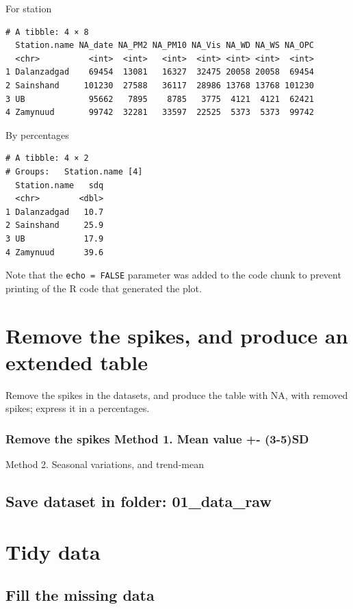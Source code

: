 \documentclass[
]{agujournal2019}
\begin{document}
For station

\begin{verbatim}
# A tibble: 4 × 8
  Station.name NA_date NA_PM2 NA_PM10 NA_Vis NA_WD NA_WS NA_OPC
  <chr>          <int>  <int>   <int>  <int> <int> <int>  <int>
1 Dalanzadgad    69454  13081   16327  32475 20058 20058  69454
2 Sainshand     101230  27588   36117  28986 13768 13768 101230
3 UB             95662   7895    8785   3775  4121  4121  62421
4 Zamynuud       99742  32281   33597  22525  5373  5373  99742
\end{verbatim}

By percentages

\begin{verbatim}
# A tibble: 4 × 2
# Groups:   Station.name [4]
  Station.name   sdq
  <chr>        <dbl>
1 Dalanzadgad   10.7
2 Sainshand     25.9
3 UB            17.9
4 Zamynuud      39.6
\end{verbatim}

Note that the \texttt{echo\ =\ FALSE} parameter was added to the code
chunk to prevent printing of the R code that generated the plot.

\section{Remove the spikes, and produce an extended
table}\label{remove-the-spikes-and-produce-an-extended-table}

Remove the spikes in the datasets, and produce the table with NA, with
removed spikes; express it in a percentages.

\subsubsection{Remove the spikes Method 1. Mean value +-
(3-5)SD}\label{remove-the-spikes-method-1.-mean-value---3-5sd}

Method 2. Seasonal variations, and trend-mean

\subsection{Save dataset in folder:
01\_data\_raw}\label{save-dataset-in-folder-01_data_raw}

\section{Tidy data}\label{tidy-data}

\subsection{Fill the missing data}\label{fill-the-missing-data}
\end{document}
